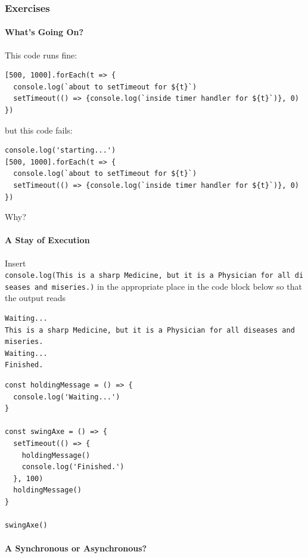 \subsubsection{Exercises}\label{s:promises-exercises}

\paragraph{What's Going On?}\label{whats-going-on}

This code runs fine:

\begin{verbatim}
[500, 1000].forEach(t => {
  console.log(`about to setTimeout for ${t}`)
  setTimeout(() => {console.log(`inside timer handler for ${t}`)}, 0)
})
\end{verbatim}

but this code fails:

\begin{verbatim}
console.log('starting...')
[500, 1000].forEach(t => {
  console.log(`about to setTimeout for ${t}`)
  setTimeout(() => {console.log(`inside timer handler for ${t}`)}, 0)
})
\end{verbatim}

Why?

\paragraph{A Stay of Execution}\label{a-stay-of-execution}

Insert
\texttt{console.log(\textquotesingle{}This\ is\ a\ sharp\ Medicine,\ but\ it\ is\ a\ Physician\ for\ all\ diseases\ and\ miseries.\textquotesingle{})}
in the appropriate place in the code block below so that the output
reads

\begin{verbatim}
Waiting...
This is a sharp Medicine, but it is a Physician for all diseases and miseries.
Waiting...
Finished.
\end{verbatim}

\begin{verbatim}
const holdingMessage = () => {
  console.log('Waiting...')
}

const swingAxe = () => {
  setTimeout(() => {
    holdingMessage()
    console.log('Finished.')
  }, 100)
  holdingMessage()
}

swingAxe()
\end{verbatim}

\paragraph{A Synchronous or
Asynchronous?}\label{a-synchronous-or-asynchronous}

